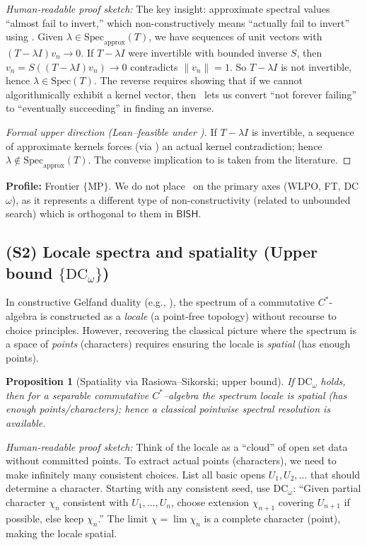 \documentclass[11pt]{article}
\theoremstyle{plain}
\newtheorem{proposition}[theorem]{Proposition}
\theoremstyle{definition}
\theoremstyle{remark}
\newenvironment{hrproof}{\noindent\textit{Human-readable proof sketch:} }{}
\newcommand{\BISH}{\mathsf{BISH}}
\newcommand{\DCw}{\mathrm{DC}_\omega}
\newcommand{\MP}{\mathrm{MP}}
\begin{document}
\begin{hrproof}
The key insight: approximate spectral values ``almost fail to invert,'' which non-constructively means ``actually fail to invert'' using \MP. Given $\lambda\in\mathrm{Spec}_{\mathrm{approx}}(T)$, we have sequences of unit vectors with $(T-\lambda I)v_n\to 0$. If $T-\lambda I$ were invertible with bounded inverse $S$, then $v_n = S((T-\lambda I)v_n)\to 0$ contradicts $\|v_n\|=1$. So $T-\lambda I$ is not invertible, hence $\lambda\in\mathrm{Spec}(T)$. The reverse requires showing that if we cannot algorithmically exhibit a kernel vector, then \MP\ lets us convert ``not forever failing'' to ``eventually succeeding'' in finding an inverse.
\end{hrproof}

\begin{proof}[Formal upper direction (Lean--feasible under \MP)]
If $T-\lambda I$ is invertible, a sequence of approximate kernels forces (via \MP) an actual kernel contradiction; hence $\lambda\notin \mathrm{Spec}_{\mathrm{approx}}(T)$.
The converse implication to \MP is taken from the literature.
\end{proof}

\noindent\textbf{Profile:} Frontier $\{\MP\}$. We do not place \MP\ on the primary axes (WLPO, FT, DC$\omega$), as it represents a different type of non-constructivity (related to unbounded search) which is orthogonal to them in $\BISH$.

\subsection{(S2) Locale spectra and spatiality (Upper bound $\{\DCw\}$)}
In constructive Gelfand duality (e.g., \cite{CoquandSpitters}), the spectrum of a commutative $C^*$-algebra is constructed as a \emph{locale} (a point-free topology) without recourse to choice principles. However, recovering the classical picture where the spectrum is a space of \emph{points} (characters) requires ensuring the locale is \emph{spatial} (has enough points).

\begin{proposition}[Spatiality via Rasiowa--Sikorski; upper bound]
If $\DCw$ holds, then for a \emph{separable} commutative $C^*$--algebra the spectrum locale is spatial (has enough points/characters); hence a classical pointwise spectral resolution is available.
\end{proposition}

\begin{hrproof}
Think of the locale as a ``cloud'' of open set data without committed points. To extract actual points (characters), we need to make infinitely many consistent choices. List all basic opens $U_1, U_2,\ldots$ that should determine a character. Starting with any consistent seed, use $\DCw$: ``Given partial character $\chi_n$ consistent with $U_1,\ldots,U_n$, choose extension $\chi_{n+1}$ covering $U_{n+1}$ if possible, else keep $\chi_n$.'' The limit $\chi = \lim \chi_n$ is a complete character (point), making the locale spatial.
\end{hrproof}
\end{document}
